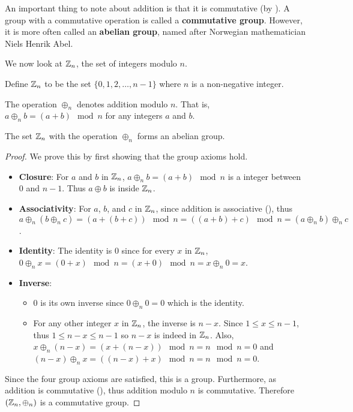 An important thing to note about addition is that it is commutative (by ). A group with a commutative operation is called a \textbf{commutative group}. However, it is more often called an \textbf{abelian group}, named after Norwegian mathematician Niels Henrik Abel.

We now look at $\mathbb{Z}_n$, the set of integers modulo $n$.
\begin{definition}
    Define $\mathbb{Z}_n$ to be the set $\{0, 1, 2, \dots, n-1\}$ where $n$ is a non-negative integer.
\end{definition}
\begin{definition}
    The operation $\oplus_n$ denotes addition modulo $n$. That is, $a \oplus_n b = (a + b) \mod{n}$ for any integers $a$ and $b$.
\end{definition}
\begin{proposition}\label{prop-Zn-is-abelian-group}
    The set $\mathbb{Z}_n$ with the operation $\oplus_n$ forms an abelian group.
\end{proposition}
\begin{proof}
    We prove this by first showing that the group axioms hold.
    \begin{itemize}
        \item \textbf{Closure}: For $a$ and $b$ in $\mathbb{Z}_n$, $a \oplus_n b = (a + b) \mod{n}$ is a integer between 0 and $n - 1$. Thus $a \oplus b$ is inside $\mathbb{Z}_n$.
        \item \textbf{Associativity}: For $a$, $b$, and $c$ in $\mathbb{Z}_n$, since addition is associative (), thus $a \oplus_n (b \oplus_n c) = (a + (b + c)) \mod{n} = ((a + b) + c) \mod{n} = (a \oplus_n b) \oplus_n c$.
        \item \textbf{Identity}: The identity is $0$ since for every $x$ in $\mathbb{Z}_n$, $0 \oplus_n x = (0 + x) \mod{n} = (x + 0) \mod{n} = x \oplus_n 0 = x$.
        \item \textbf{Inverse}:
        \begin{itemize}
            \item $0$ is its own inverse since $0 \oplus_n 0 = 0$ which is the identity.
            \item For any other integer $x$ in $\mathbb{Z}_n$, the inverse is $n - x$. Since $1 \leq x \leq n - 1$, thus $1 \leq n - x \leq n - 1$ so $n - x$ is indeed in $\mathbb{Z}_n$. Also, $x \oplus_n (n - x) = (x + (n - x)) \mod{n} = n \mod{n} = 0$ and $(n - x) \oplus_n x = ((n-x) + x)\mod{n} = n \mod{n} = 0$.
        \end{itemize}
    \end{itemize}
    Since the four group axioms are satisfied, this is a group. Furthermore, as addition is commutative (), thus addition modulo $n$ is commutative. Therefore $(\mathbb{Z}_n, \oplus_n)$ is a commutative group.
\end{proof}
